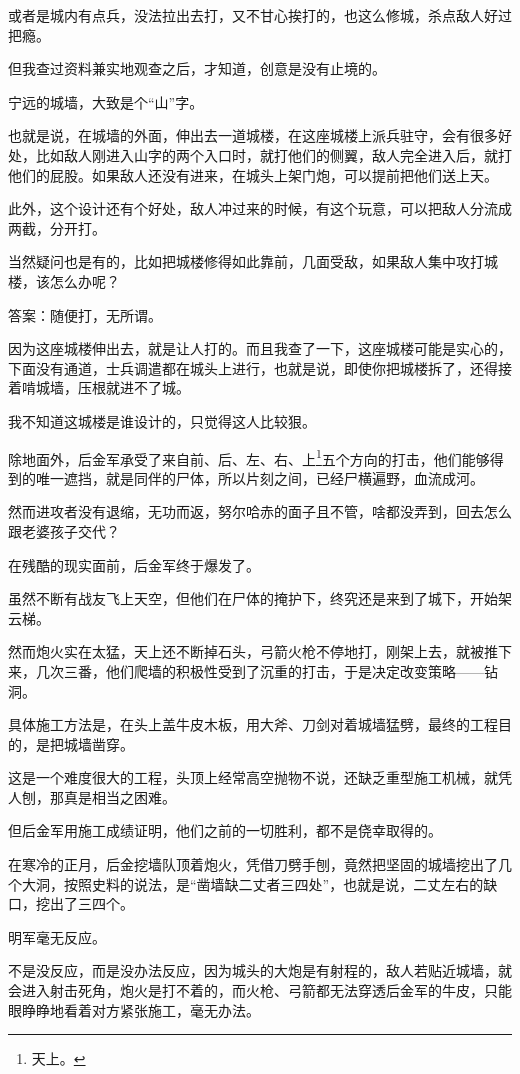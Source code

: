 \begin{multicols}{\theparacolNo}
或者是城内有点兵，没法拉出去打，又不甘心挨打的，也这么修城，杀点敌人好过把瘾。

但我查过资料兼实地观查之后，才知道，创意是没有止境的。

宁远的城墙，大致是个“山”字。

也就是说，在城墙的外面，伸出去一道城楼，在这座城楼上派兵驻守，会有很多好处，比如敌人刚进入山字的两个入口时，就打他们的侧翼，敌人完全进入后，就打他们的屁股。如果敌人还没有进来，在城头上架门炮，可以提前把他们送上天。

此外，这个设计还有个好处，敌人冲过来的时候，有这个玩意，可以把敌人分流成两截，分开打。

当然疑问也是有的，比如把城楼修得如此靠前，几面受敌，如果敌人集中攻打城楼，该怎么办呢？

答案：随便打，无所谓。

因为这座城楼伸出去，就是让人打的。而且我查了一下，这座城楼可能是实心的，下面没有通道，士兵调遣都在城头上进行，也就是说，即使你把城楼拆了，还得接着啃城墙，压根就进不了城。

我不知道这城楼是谁设计的，只觉得这人比较狠。

除地面外，后金军承受了来自前、后、左、右、上\footnote{天上。}五个方向的打击，他们能够得到的唯一遮挡，就是同伴的尸体，所以片刻之间，已经尸横遍野，血流成河。

然而进攻者没有退缩，无功而返，努尔哈赤的面子且不管，啥都没弄到，回去怎么跟老婆孩子交代？

在残酷的现实面前，后金军终于爆发了。

虽然不断有战友飞上天空，但他们在尸体的掩护下，终究还是来到了城下，开始架云梯。

然而炮火实在太猛，天上还不断掉石头，弓箭火枪不停地打，刚架上去，就被推下来，几次三番，他们爬墙的积极性受到了沉重的打击，于是决定改变策略——钻洞。

具体施工方法是，在头上盖牛皮木板，用大斧、刀剑对着城墙猛劈，最终的工程目的，是把城墙凿穿。

这是一个难度很大的工程，头顶上经常高空抛物不说，还缺乏重型施工机械，就凭人刨，那真是相当之困难。

但后金军用施工成绩证明，他们之前的一切胜利，都不是侥幸取得的。

在寒冷的正月，后金挖墙队顶着炮火，凭借刀劈手刨，竟然把坚固的城墙挖出了几个大洞，按照史料的说法，是“凿墙缺二丈者三四处”，也就是说，二丈左右的缺口，挖出了三四个。

明军毫无反应。

不是没反应，而是没办法反应，因为城头的大炮是有射程的，敌人若贴近城墙，就会进入射击死角，炮火是打不着的，而火枪、弓箭都无法穿透后金军的牛皮，只能眼睁睁地看着对方紧张施工，毫无办法。


\end{multicols}
